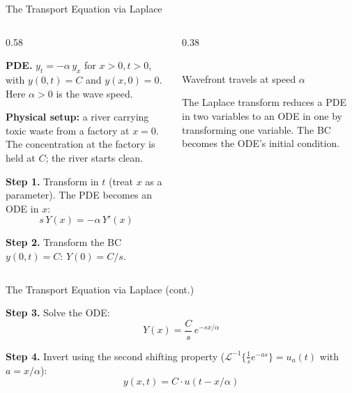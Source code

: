 \documentclass[aspectratio=169,11pt]{beamer}
\begin{document}
\begin{frame}{The Transport Equation via Laplace}
\footnotesize
\begin{columns}[T]
\begin{column}{0.58\textwidth}
\begin{examplebox}
\textbf{PDE.} $y_t = -\alpha\, y_x$ for $x > 0, t > 0$, with $y(0,t) = C$ and $y(x,0) = 0$. Here $\alpha > 0$ is the wave speed.

\textbf{Physical setup:} a river carrying toxic waste from a factory at $x=0$. The concentration at the factory is held at $C$; the river starts clean.

\textbf{Step 1.} Transform in $t$ (treat $x$ as a parameter). The PDE becomes an ODE in $x$:
\[s\, Y(x) = -\alpha\, Y'(x)\]

\textbf{Step 2.} Transform the BC $y(0,t) = C$: $Y(0) = C/s$.

\end{examplebox}
\end{column}
\begin{column}{0.38\textwidth}
\centering
{}\\[1mm]
{\footnotesize Wavefront travels at speed $\alpha$}
\vspace{1mm}
\begin{conceptbox}
The Laplace transform reduces a PDE in two variables to an ODE in one by transforming one variable. The BC becomes the ODE's initial condition.
\end{conceptbox}
\end{column}
\end{columns}
\end{frame}

\begin{frame}{The Transport Equation via Laplace (cont.)}
\footnotesize
\begin{examplebox}
\textbf{Step 3.} Solve the ODE:
\[Y(x) = \frac{C}{s}\, e^{-sx/\alpha}\]

\textbf{Step 4.} Invert using the second shifting property ($\mathcal{L}^{-1}\{\frac{1}{s}e^{-as}\} = u_a(t)$ with $a = x/\alpha$):
\[y(x,t) = C \cdot u(t - x/\alpha)\]
\end{examplebox}
\end{frame}
\end{document}
